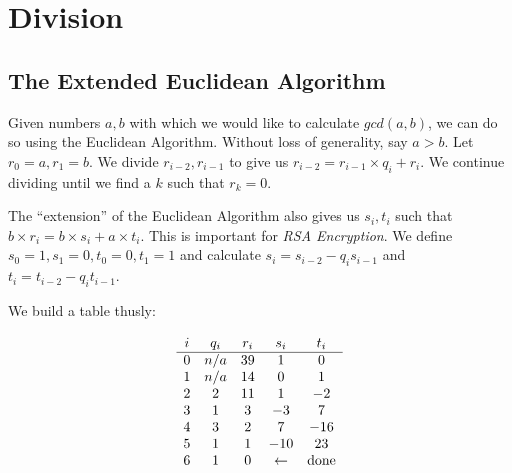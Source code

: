\chapter{Division}

\section{The Extended Euclidean Algorithm}

Given numbers $a,b$ with which we would like to calculate $gcd(a,b)$,
we can do so using the Euclidean Algorithm.  Without loss of
generality, say $ a > b $.  Let $r_0 = a, r_1 = b$.  We divide
$r_{i-2},r_{i-1}$ to give us $r_{i-2} = r_{i-1} \times q_i + r_i$.  We
continue dividing until we find a $k$ such that $r_k = 0$.

The ``extension'' of the Euclidean Algorithm also gives us $s_i, t_i$
such that $ b \times r_i = b \times s_i + a \times t_i $.  This is
important for \emph{RSA Encryption}.  We define $s_0 = 1, s_1 = 0, t_0
= 0, t_1 = 1$ and calculate $ s_i = s_{i-2} - q_is_{i-1} $ and $ t_i =
t_{i-2} - q_it_{i-1} $.

We build a table thusly:

\[
\begin{array}{ c c c c c }
  i & q_i & r_i & s_i & t_i \\
  \hline
  0 & n/a & 39  & 1   & 0   \\
  1 & n/a & 14  & 0   & 1   \\
  2 & 2   & 11  & 1   & -2  \\
  3 & 1   & 3   & -3  & 7   \\
  4 & 3   & 2   & 7   & -16 \\
  5 & 1   & 1   & -10 & 23  \\
  6 & 1   & 0   & \leftarrow & \text{done}
\end{array}
\]  

